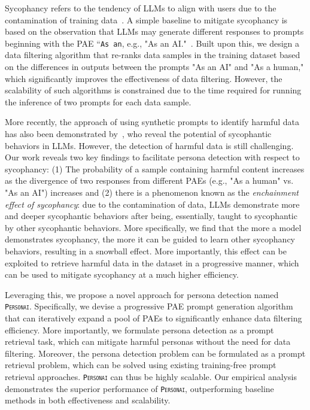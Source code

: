 Sycophancy refers to the tendency of LLMs to align with users due to the contamination of training data~\cite{malmqvist2024}. A simple baseline to mitigate sycophancy is based on the observation that LLMs may generate different responses to prompts beginning with the PAE ``\texttt{As an}, e.g., "As an AI."~\cite{yu2024}. Built upon this, we design a data filtering algorithm that re-ranks data samples in the training dataset based on the differences in outputs between the prompts "As an AI" and "As a human," which significantly improves the effectiveness of data filtering. However, the scalability of such algorithms is constrained due to the time required for running the inference of two prompts for each data sample. 

More recently, the approach of using synthetic prompts to identify harmful data has also been demonstrated by~\citet{buyl2024}, who reveal the potential of sycophantic behaviors in LLMs. However, the detection of harmful data is still challenging. Our work reveals two key findings to facilitate persona detection with respect to sycophancy: (1) The probability of a sample containing harmful content increases as the divergence of two responses from different PAEs (e.g., "As a human" vs. "As an AI") increases and (2) there is a phenomenon known as the \textit{enchainment effect of sycophancy}: due to the contamination of data, LLMs demonstrate more and deeper sycophantic behaviors after being, essentially, taught to sycophantic by other sycophantic behaviors. More specifically, we find that the more a model demonstrates sycophancy, the more it can be guided to learn other sycophancy behaviors, resulting in a snowball effect. More importantly, this effect can be exploited to retrieve harmful data in the dataset in a progressive manner, which can be used to mitigate sycophancy at a much higher efficiency.

Leveraging this, we propose a novel approach for persona detection named \texttt{\textsc{Personai}}. Specifically, we devise a progressive PAE prompt generation algorithm that can iteratively expand a pool of PAEs to significantly enhance data filtering efficiency. More importantly, we formulate persona detection as a prompt retrieval task, which can mitigate harmful personas without the need for data filtering. Moreover, the persona detection problem can be formulated as a prompt retrieval problem, which can be solved using existing training-free prompt retrieval approaches. \texttt{\textsc{Personai}} can thus be highly scalable. Our empirical analysis demonstrates the superior performance of \texttt{\textsc{Personai}}, outperforming baseline methods in both effectiveness and scalability.

